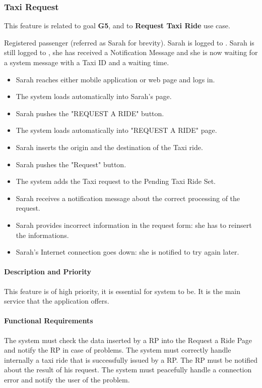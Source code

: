 \subsubsection{Taxi Request}
This feature is related to goal \textbf{G5}, and to \textbf{Request Taxi Ride} use case.
\begin{itemize}
	 Registered passenger (referred as Sarah for brevity).
	 Sarah is logged to \myTaxiService{}.
	 Sarah is still logged to \myTaxiService{}, she has received a Notification Message and she is now waiting for a system message with a Taxi ID and a waiting time.
	\begin{itemize}
		\item Sarah reaches either \myTaxiService{} mobile application or web page and logs in.
		\item The system loads automatically into Sarah's page.
		\item Sarah pushes the "REQUEST A RIDE" button.
		\item The system loads automatically into "REQUEST A RIDE" page.
		\item Sarah inserts the origin and the destination of the Taxi ride.
		\item Sarah pushes the "Request" button.
		\item The system adds the Taxi request to the Pending Taxi Ride Set.
		\item Sarah receives a notification message about the correct processing of the request. 
	\end{itemize}
	\begin{itemize}
		\item Sarah provides incorrect information in the request form: she has to reinsert the informations.
		\item Sarah's Internet connection goes down: she is notified to try again later.
	\end{itemize}
\end{itemize}
\paragraph{Description and Priority}
This feature is of high priority, it is essential for \myTaxiService{} system to be. It is the main service that the application offers.
\paragraph{Functional Requirements}
\begin{itemize}
	 The system must check the data inserted by a RP into the Request a Ride Page and notify the RP in case of problems.
	 The system must correctly handle internally a taxi ride that is successfully issued by a RP.
	 The RP must be notified about the result of his request.
	 The system must peacefully handle a connection error and notify the user of the problem.
\end{itemize}
